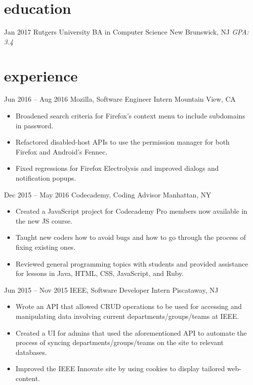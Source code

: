 \documentclass[]{friggeri-cv}
\begin{document}


\section{education}

\begin{entrylist}
  \entry
    {Jan 2017}
    {Rutgers University {\normalfont BA in Computer Science}}
    {New Brunswick, NJ}
    {\emph{GPA: 3.4}}
\end{entrylist}

\section{experience}

\begin{entrylist}
  \entry
    {Jun 2016 – Aug 2016}
    {Mozilla, Software Engineer Intern}
    {Mountain View, CA}
    {\vspace{-3mm}\begin{itemize}[leftmargin=10pt,itemsep=4pt]
     \item Broadened search criteria for Firefox’s context menu to include subdomains in password.
     \item Refactored disabled-host APIs to use the permission manager for both Firefox and Android’s Fennec.
     \item Fixed regressions for Firefox Electrolysis and improved dialogs and notification popups.
     \end{itemize}}
  \entry
    {Dec 2015 – May 2016}
    {Codecademy, Coding Advisor}
    {Manhattan, NY}
    {\vspace{-3mm}\begin{itemize}[leftmargin=10pt,itemsep=4pt]
     \item Created a JavaScript project for Codecademy Pro members now available in the new JS course.
     \item Taught new coders how to avoid bugs and how to go through the process of fixing existing ones.
     \item Reviewed general programming topics with students and provided assistance for lessons in Java, HTML, CSS, JavaScript, and Ruby.
     \end{itemize}}
  \entry
    {Jun 2015 – Nov 2015}
    {IEEE, Software Developer Intern}
    {Piscataway, NJ}
    {\vspace{-3mm}\begin{itemize}[leftmargin=10pt,itemsep=4pt]
     \item Wrote an API that allowed CRUD operations to be used for accessing and manipulating data involving current departments/groups/teams at IEEE. 
     \item Created a UI for admins that used the aforementioned API to automate the process of syncing departments/groups/teams on the site to relevant databases.
     \item Improved the IEEE Innovate site by using cookies to display tailored web-content.
     \end{itemize}}
\end{entrylist}
\end{document}
